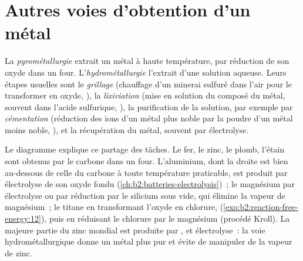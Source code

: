 \section{Autres voies d'obtention d'un métal}

\begin{definition}\label{def:b2:ellingham:metallurgy}
La \emph{pyrométallurgie} extrait un métal à haute
température, par réduction de son oxyde dans un four. L'\emph{hydrométallurgie}
l'extrait d'une solution aqueuse. Leurs étapes usuelles sont le
\emph{grillage} (chauffage d'un minerai sulfuré dans l'air pour le transformer en
oxyde, ), la \emph{lixiviation}
(mise en solution du composé du métal, souvent dans l'acide sulfurique, ), la purification de la solution, par exemple par
\emph{cémentation} (réduction des ions d'un métal plus noble
par la poudre d'un métal moins noble, ), et la
récupération du métal, souvent par électrolyse.
\end{definition}

Le diagramme explique ce partage des tâches. Le fer, le zinc, le plomb, l'étain sont obtenus par
le carbone dans un four. L'aluminium, dont la droite est bien au-dessous de celle du carbone à toute
température praticable, est produit par électrolyse de son oxyde fondu
(\cref{ch:b2:batteries-electrolysis})~; le magnésium par électrolyse ou par
réduction par le silicium sous vide, qui élimine la vapeur de magnésium~;
le titane en transformant l'oxyde en chlorure,  (\cref{exo:b2:reaction-free-energy:12}), puis en réduisant le chlorure par
le magnésium (procédé Kroll). La majeure partie du zinc mondial est produite par ,
 et électrolyse~: la voie hydrométallurgique donne un métal plus pur et
évite de manipuler de la vapeur de zinc.

